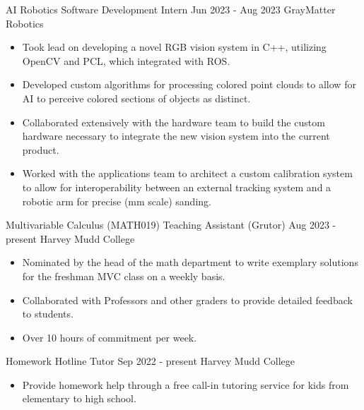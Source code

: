 \documentclass[9pt]{resume}
\begin{document}
    
    \vspace{0.5cm}

    \begin{experiencelist}
        \experience 
            {AI Robotics Software Development Intern}
            {Jun 2023 - Aug 2023}
            {GrayMatter Robotics}
            {\begin{itemize}[noitemsep, topsep=1pt]
                \item Took lead on developing a novel RGB vision system in C++, utilizing OpenCV and PCL, which integrated with ROS.
                \item Developed custom algorithms for processing colored point clouds to allow for AI to perceive colored sections of objects as distinct.
                \item Collaborated extensively with the hardware team to build the custom hardware necessary to integrate the new vision system into the current product.
                \item Worked with the applications team to architect a custom calibration system to allow for interoperability between an external tracking system and a robotic arm for precise (mm scale) sanding.
            \end{itemize}}
        \experience 
            {Multivariable Calculus (MATH019) Teaching Assistant (Grutor)}
            {Aug 2023 - present}
            {Harvey Mudd College}
            {\begin{itemize}[noitemsep, topsep=1pt] 
                \item Nominated by the head of the math department to write exemplary solutions for the freshman MVC class on a weekly basis.
                \item Collaborated with Professors and other graders to provide detailed feedback to students. 
                \item Over 10 hours of commitment per week.
            \end{itemize}}
        \experience
            {Homework Hotline Tutor}
            {Sep 2022 - present} 
            {Harvey Mudd College}
            {\begin{itemize}[noitemsep, topsep=1pt]
                \item Provide homework help through a free call-in tutoring service for kids from elementary to high school.
            \end{itemize}}
    \end{experiencelist}
\end{document}
